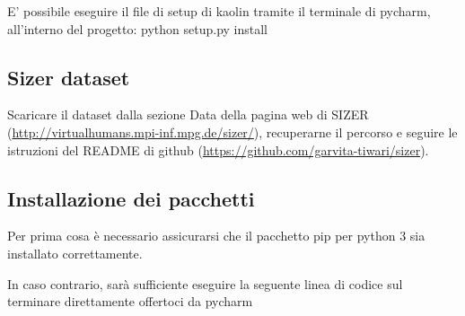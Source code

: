 






\medskip

E’ possibile eseguire il file di setup di kaolin tramite il terminale di pycharm, all’interno del progetto:
python setup.py install

\medskip



\subsection{Sizer dataset}

\medskip

Scaricare il dataset dalla sezione Data della pagina web di SIZER (\url{http://virtualhumans.mpi-inf.mpg.de/sizer/}), recuperarne il percorso e seguire le istruzioni del README di github (\url{https://github.com/garvita-tiwari/sizer}).



\medskip

\subsection{Installazione dei pacchetti}

\medskip

Per prima cosa è necessario assicurarsi che il pacchetto pip per python 3 sia installato correttamente.

\medskip

In caso contrario, sarà sufficiente eseguire la seguente linea di codice sul terminare direttamente offertoci da pycharm






